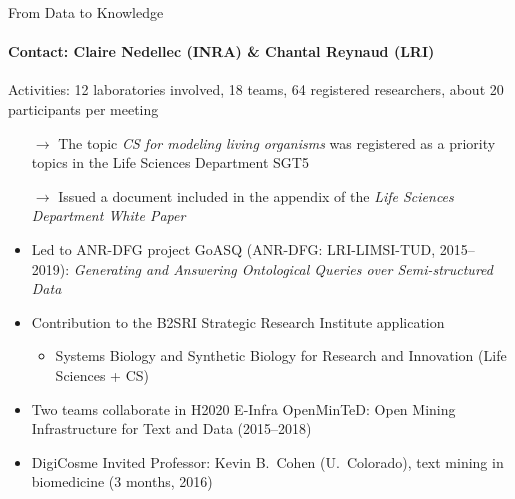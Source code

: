 \begin{frame}{From Data to Knowledge}
\framesubtitle{Contact: Claire Nedellec (INRA) \& Chantal Reynaud (LRI)}

Activities: 12 laboratories involved, 18 teams, 64 registered researchers, about 20 participants per meeting


\begin{itemize}
  \item[$\rightarrow$] The topic \emph{CS for modeling living organisms} was registered as a priority topics in the Life Sciences Department SGT5
  \item[$\rightarrow$] Issued a document included in the appendix of the \emph{Life Sciences Department White Paper}

\item Led to ANR-DFG project GoASQ (ANR-DFG: LRI-LIMSI-TUD, 2015--2019): \emph{Generating and Answering Ontological Queries over Semi-structured Data}
\item Contribution to the B2SRI Strategic Research Institute application
  \begin{itemize}
  \item Systems Biology and Synthetic Biology for Research and Innovation (Life Sciences + CS)
  \end{itemize}
\item Two teams collaborate in H2020 E-Infra OpenMinTeD: Open Mining Infrastructure for Text and Data (2015--2018)
\item DigiCosme Invited Professor: Kevin B.\ Cohen (U.\ Colorado), text mining in biomedicine (3 months, 2016)
\end{itemize}

\end{frame}


